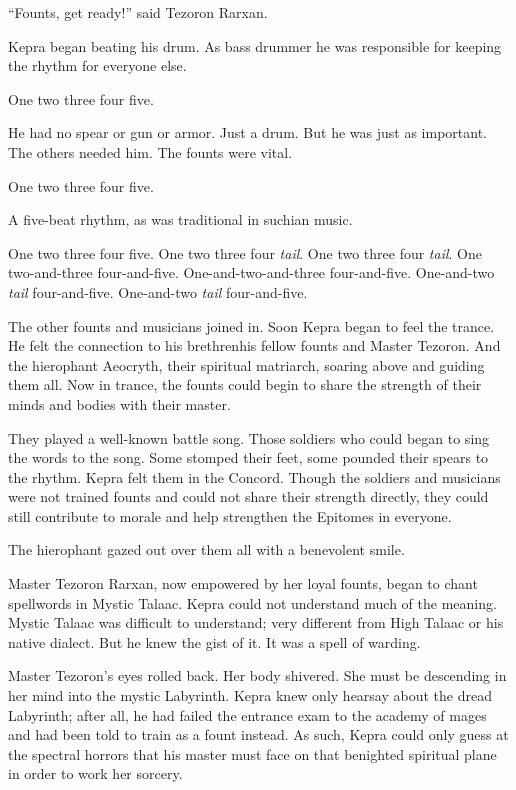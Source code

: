 \documentclass
  [a4paper,
   12pt,
   oneside
  ]%
  {article}
\newcommand{\drum}[1]{\textsf{#1}}
\begin{document}
``Founts, get ready!'' said Tezoron Rarxan. 

Kepra began beating his drum. As bass drummer he was responsible for keeping the rhythm for everyone else.

\drum{One two three four five.} 

He had no spear or gun or armor. Just a drum. 
But he was just as important.
The others needed him. 
The founts were vital. 

\drum{One two three four five.}

A five-beat rhythm, as was traditional in suchian music. 

\drum{%
    One two three four five. One two three four \emph{tail}. One two three four \emph{tail}. One two-and-three four-and-five. One-and-two-and-three four-and-five. One-and-two \emph{tail} four-and-five. One-and-two \emph{tail} four-and-five.}

The other founts and musicians joined in. 
Soon Kepra began to feel the trance. 
He felt the connection to his brethren\dash{}his fellow founts and Master Tezoron. And the hierophant Aeocryth, their spiritual matriarch, soaring above and guiding them all. 
Now in trance, the founts could begin to share the strength of their minds and bodies with their master.

They played a well-known battle song. 
Those soldiers who could began to sing the words to the song. Some stomped their feet, some pounded their spears to the rhythm. Kepra felt them in the Concord. Though the soldiers and musicians were not trained founts and could not share their strength directly, they could still contribute to morale and help strengthen the Epitomes in everyone.

The hierophant gazed out over them all with a benevolent smile.

Master Tezoron Rarxan, now empowered by her loyal founts, began to chant spellwords in Mystic Talaac. 
Kepra could not understand much of the meaning. Mystic Talaac was difficult to understand; very different from High Talaac or his native dialect.
But he knew the gist of it. It was a spell of warding. 

Master Tezoron’s eyes rolled back. Her body shivered. She must be descending in her mind into the mystic Labyrinth. Kepra knew only hearsay about the dread Labyrinth; after all, he had failed the entrance exam to the academy of mages and had been told to train as a fount instead. 
As such, Kepra could only guess at the spectral horrors that his master must face on that benighted spiritual plane in order to work her sorcery. 
\end{document}
